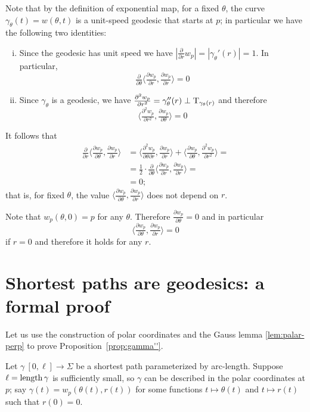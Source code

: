 Note that by the definition of exponential map, for a fixed $\theta$, the curve $\gamma_\theta(t)=w(\theta,t)$ is a unit-speed geodesic that starts at $p$;
in particular we have the following two identities:
\begin{enumerate}[(i)]
\item Since the geodesic has unit speed we have $|\tfrac{\partial}{\partial r}w_p|=|\gamma_\theta'(r)|=1$.
In particular,
 \[\tfrac{\partial}{\partial \theta}\langle\tfrac{\partial w_p}{\partial r},\tfrac{\partial w_p}{\partial r}\rangle=0\]
\item Since $\gamma_\theta$ is a geodesic, we have $\tfrac{\partial^2w_p}{\partial r^2}=\gamma''_\theta(r)\perp\mathrm{T}_{\gamma_\theta(r)}$ and therefore 
\[\langle\tfrac{\partial^2w_p}{\partial r^2},\tfrac{\partial w_p}{\partial \theta}\rangle=0\]
\end{enumerate}
It follows that
\begin{align*}
\tfrac{\partial}{\partial r}
\langle\tfrac{\partial w_p}{\partial\theta},\tfrac{\partial w_p}{\partial r}\rangle
&=\langle\tfrac{\partial^2 w_p}{\partial\theta\partial r},\tfrac{\partial w_p}{\partial r}\rangle
+
\langle\tfrac{\partial w_p}{\partial\theta},\tfrac{\partial^2 w_p}{\partial r^2}\rangle=
\\
&=\tfrac12\cdot \tfrac{\partial}{\partial \theta}\langle\tfrac{\partial w_p}{\partial r},\tfrac{\partial w_p}{\partial r}\rangle=
\\
&=0;
\end{align*}
that is, for fixed $\theta$, the value $\langle\tfrac{\partial w_p}{\partial\theta},\tfrac{\partial w_p}{\partial r}\rangle$ does not depend on $r$.

Note that $w_p(\theta,0)=p$ for any $\theta$.
Therefore
$\tfrac{\partial w_p}{\partial\theta}=0$
and in particular 
\[\langle\tfrac{\partial w_p}{\partial\theta},\tfrac{\partial w_p}{\partial r}\rangle=0\]
if $r=0$ and therefore it holds for any $r$.
\qeds

\section{Shortest paths are geodesics: a formal proof}

Let us use the construction of polar coordinates and the Gauss lemma \ref{lem:palar-perp} to prove Proposition~\ref{prop:gamma''}.

\label{page:proof-of-gamma''}
Let $\gamma\:[0,\ell]\to\Sigma$ be a shortest path parameterized by arc-length.
Suppose $\ell=\mathop{\rm length}\nolimits\gamma$ is sufficiently small, so $\gamma$ can be described in the polar coordinates at $p$;
say $\gamma(t)=w_p(\theta(t),r(t))$ for some functions $t\mapsto \theta(t)$ and $t\mapsto r(t)$ such that $r(0)=0$. %

